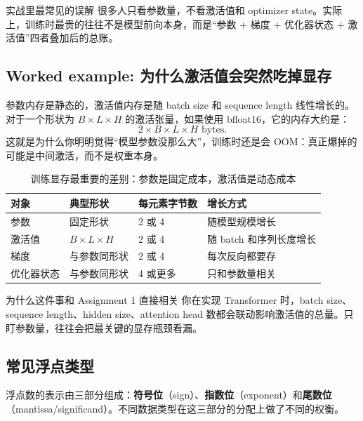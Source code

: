 \begin{importantbox}{实战里最常见的误解}
很多人只看参数量，不看激活值和 optimizer state。实际上，训练时最贵的往往不是模型前向本身，而是“参数 + 梯度 + 优化器状态 + 激活值”四者叠加后的总账。
\end{importantbox}

\subsection{Worked example: 为什么激活值会突然吃掉显存}

参数内存是静态的，激活值内存是随 batch size 和 sequence length 线性增长的。对于一个形状为 \(B\times L\times H\) 的激活张量，如果使用 bfloat16，它的内存大约是：
\[
2 \times B \times L \times H \text{ bytes}.
\]
这就是为什么你明明觉得“模型参数没那么大”，训练时还是会 OOM：真正爆掉的可能是中间激活，而不是权重本身。

\begin{table}[H]
\centering
\begin{tabular}{p{}p{}p{}p{}}
\toprule
\textbf{对象} & \textbf{典型形状} & \textbf{每元素字节数} & \textbf{增长方式} \\
\midrule
参数 & 固定形状 & 2 或 4 & 随模型规模增长 \\
激活值 & \(B\times L\times H\) & 2 或 4 & 随 batch 和序列长度增长 \\
梯度 & 与参数同形状 & 2 或 4 & 每次反向都要存 \\
优化器状态 & 与参数同形状 & 4 或更多 & 只和参数量相关 \\
\bottomrule
\end{tabular}
\caption{训练显存最重要的差别：参数是固定成本，激活值是动态成本}
\end{table}

\begin{importantbox}{为什么这件事和 Assignment 1 直接相关}
你在实现 Transformer 时，batch size、sequence length、hidden size、attention head 数都会联动影响激活值的总量。只盯参数量，往往会把最关键的显存瓶颈看漏。
\end{importantbox}

\subsection{常见浮点类型}

浮点数的表示由三部分组成：\textbf{符号位}（sign）、\textbf{指数位}（exponent）和\textbf{尾数位}（mantissa/significand）。不同数据类型在这三部分的分配上做了不同的权衡。

